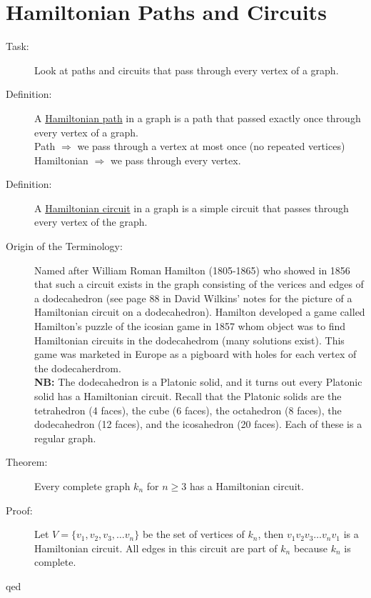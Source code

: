 \documentclass[10pt]{article}
\begin{document}
	\section{Hamiltonian Paths and Circuits}
	\begin{description}
		\item[Task:] Look at paths and circuits that pass through every vertex of a graph.
		\item[Definition:] A \underline{Hamiltonian path} in a graph is a path that passed exactly once through every vertex of a graph. \\
		Path $\Rightarrow$ we pass through a vertex at most once (no repeated vertices) \\
		Hamiltonian $\Rightarrow$ we pass through every vertex.
		\item[Definition:] A \underline{Hamiltonian circuit} in a graph is a simple circuit that passes through every vertex of the graph.
		\item[Origin of the Terminology:] Named after William Roman Hamilton (1805-1865) who showed in 1856 that such a circuit exists in the graph consisting of the verices and edges of a dodecahedron (see page 88 in David Wilkins' notes for the picture of a Hamiltonian circuit on a dodecahedron). Hamilton developed a game called Hamilton's puzzle of the icosian game in 1857 whom object was to find Hamiltonian circuits in the dodecahedrom (many solutions exist). This game was marketed in Europe as a pigboard with holes for each vertex of the dodecaherdrom. \\
		\textbf{NB:} The dodecahedron is a Platonic solid, and it turns out every Platonic solid has a Hamiltonian circuit. Recall that the Platonic solids are the tetrahedron (4 faces), the cube (6 faces), the octahedron (8 faces), the dodecahedron (12 faces), and the icosahedron (20 faces). Each of these is a regular graph.
		\item[Theorem:] Every complete graph $k_n$ for $n \geq 3$ has a Hamiltonian circuit.
		\item[Proof:] Let $V = \{v_1, v_2, v_3, \dots v_n\}$ be the set of vertices of $k_n$, then $v_1 v_2 v_3 \dots v_n v_1$ is a Hamiltonian circuit. All edges in this circuit are part of $k_n$ because $k_n$ is complete.
		\item[qed]
	\end{description}
	
\end{document}
